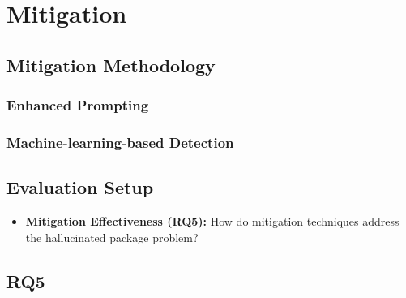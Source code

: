 \section{Mitigation}

\subsection{Mitigation Methodology}

\subsubsection{Enhanced Prompting}

\subsubsection{Machine-learning-based Detection}

\subsubsection{}



\subsection{Evaluation Setup}


\begin{itemize}
    \item \textbf{Mitigation Effectiveness (RQ5):} How do mitigation techniques address the hallucinated package problem?
\end{itemize}


\subsection{RQ5}


